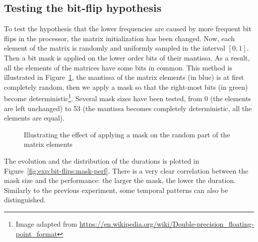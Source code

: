         \subsection{Testing the bit-flip hypothesis}
            To test the hypothesis that the lower frequencies are caused by more frequent bit flips in the processor,
            the matrix initialization has been changed. Now, each element of the matrix is randomly and uniformly
            sampled in the interval \([0,1]\). Then a bit mask is applied on the lower order bits of their mantissa. As
            a result, all the elements of the matrices have some bits in common. This method is illustrated in
            Figure~\ref{fig:exp:bit-flips:mask_illustration}, the mantissa of the matrix elements (in blue) is at first
            completely random, then we apply a mask so that the right-most bits (in green) become
            deterministic\footnote{Image adapted from
            \url{https://en.wikipedia.org/wiki/Double-precision_floating-point_format}}.  Several mask sizes have been
            tested, from 0 (the elements are left unchanged) to 53 (the mantissa becomes completely deterministic, all
            the elements are equal).
            \begin{figure}[htpb]
                \begin{center}
                    
                    \vspace{-0.2cm}


                    \vspace{-0.2cm}
                    
                \end{center}
                \caption{Illustrating the effect of applying a mask on the random part of the matrix
                elements\label{fig:exp:bit-flips:mask_illustration}}
            \end{figure}

            The evolution and the distribution of the \dgemm durations is plotted in
            Figure~\ref{fig:exp:bit-flips:mask-perf}. There is a very clear correlation between the mask size and the
            performance: the larger the mask, the lower the duration. Similarly to the previous experiment, some
            temporal patterns can also be distinguished.

